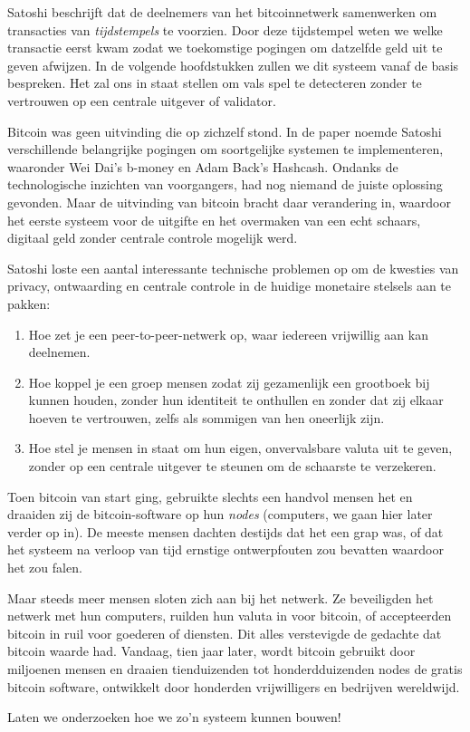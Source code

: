 Satoshi beschrijft dat de deelnemers van het bitcoinnetwerk samenwerken om transacties van \textit{tijdstempels} te voorzien. Door deze tijdstempel weten we welke transactie eerst kwam zodat we toekomstige pogingen om datzelfde geld uit te geven afwijzen. In de volgende hoofdstukken zullen we dit systeem vanaf de basis bespreken. Het zal ons in staat stellen om vals spel te detecteren zonder te vertrouwen op een centrale uitgever of validator.


Bitcoin was geen uitvinding die op zichzelf stond. In de paper noemde Satoshi verschillende belangrijke pogingen om soortgelijke systemen te implementeren, waaronder Wei Dai's b-money en Adam Back's Hashcash. Ondanks de technologische inzichten van voorgangers, had nog niemand de juiste oplossing gevonden. Maar de uitvinding van bitcoin bracht daar verandering in, waardoor het eerste systeem voor de uitgifte en het overmaken van een echt schaars, digitaal geld zonder centrale controle mogelijk werd.

Satoshi loste een aantal interessante technische problemen op om de kwesties van privacy, ontwaarding en centrale controle in de huidige monetaire stelsels aan te pakken:

\begin{enumerate}
    \item Hoe zet je een peer-to-peer-netwerk op, waar iedereen vrijwillig aan kan deelnemen.
    \item Hoe koppel je een groep mensen zodat zij gezamenlijk een grootboek bij kunnen houden, zonder hun identiteit te onthullen en zonder dat zij elkaar hoeven te vertrouwen, zelfs als sommigen van hen oneerlijk zijn.
    \item Hoe stel je mensen in staat om hun eigen, onvervalsbare valuta uit te geven, zonder op een centrale uitgever te steunen om de schaarste te verzekeren.
\end{enumerate}

Toen bitcoin van start ging, gebruikte slechts een handvol mensen het en draaiden zij de bitcoin-software op hun \textit{nodes} (computers, we gaan hier later verder op in). De meeste mensen dachten destijds dat het een grap was, of dat het systeem na verloop van tijd ernstige ontwerpfouten zou bevatten waardoor het zou falen.

Maar steeds meer mensen sloten zich aan bij het netwerk. Ze beveiligden het netwerk met hun computers, ruilden hun valuta in voor bitcoin, of accepteerden bitcoin in ruil voor goederen of diensten. Dit alles verstevigde de gedachte dat bitcoin waarde had. Vandaag, tien jaar later, wordt bitcoin gebruikt door miljoenen mensen en draaien tienduizenden tot honderdduizenden nodes de gratis bitcoin software, ontwikkelt door honderden vrijwilligers en bedrijven wereldwijd.

Laten we onderzoeken hoe we zo'n systeem kunnen bouwen!